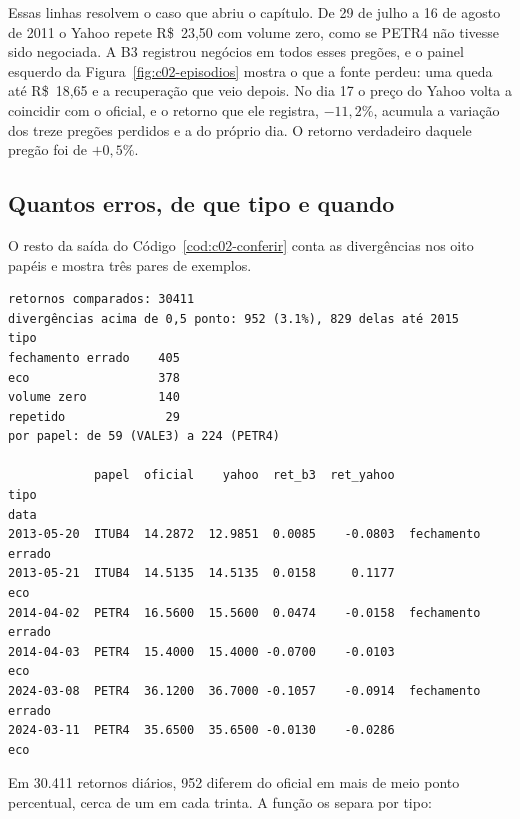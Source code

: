 Essas linhas resolvem o caso que abriu o capítulo. De 29 de julho a 16 de agosto de 2011 o Yahoo repete R\$~23,50 com volume zero, como se PETR4 não tivesse sido negociada. A B3 registrou negócios em todos esses pregões, e o painel esquerdo da Figura~\ref{fig:c02-episodios} mostra o que a fonte perdeu: uma queda até R\$~18,65 e a recuperação que veio depois. No dia 17 o preço do Yahoo volta a coincidir com o oficial, e o retorno que ele registra, $-11,2\%$, acumula a variação dos treze pregões perdidos e a do próprio dia. O retorno verdadeiro daquele pregão foi de $+0,5\%$.


\subsection{Quantos erros, de que tipo e quando}

O resto da saída do Código~\ref{cod:c02-conferir} conta as divergências nos oito papéis e mostra três pares de exemplos.

\begin{lstlisting}[style=saida]
retornos comparados: 30411
divergências acima de 0,5 ponto: 952 (3.1%), 829 delas até 2015
tipo
fechamento errado    405
eco                  378
volume zero          140
repetido              29
por papel: de 59 (VALE3) a 224 (PETR4)

            papel  oficial    yahoo  ret_b3  ret_yahoo               tipo
data
2013-05-20  ITUB4  14.2872  12.9851  0.0085    -0.0803  fechamento errado
2013-05-21  ITUB4  14.5135  14.5135  0.0158     0.1177                eco
2014-04-02  PETR4  16.5600  15.5600  0.0474    -0.0158  fechamento errado
2014-04-03  PETR4  15.4000  15.4000 -0.0700    -0.0103                eco
2024-03-08  PETR4  36.1200  36.7000 -0.1057    -0.0914  fechamento errado
2024-03-11  PETR4  35.6500  35.6500 -0.0130    -0.0286                eco
\end{lstlisting}

Em 30.411 retornos diários, 952 diferem do oficial em mais de meio ponto percentual, cerca de um em cada trinta. A função  os separa por tipo:

